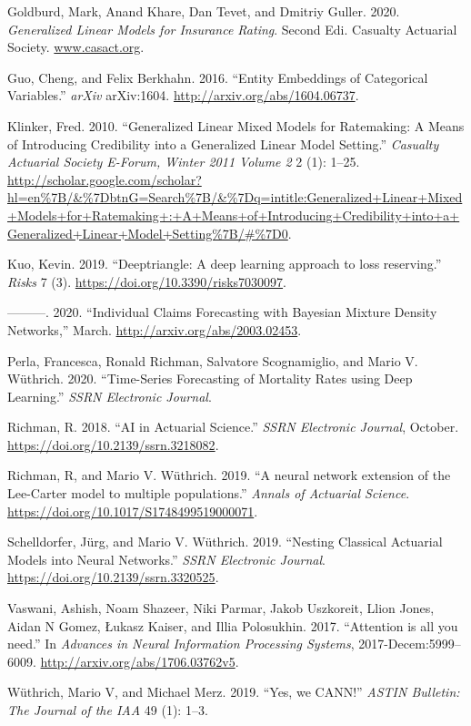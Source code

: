 \documentclass{article}
\newlength{\cslhangindent}
\newenvironment{cslreferences}%
  {\setlength{\parindent}{0pt}%
  \everypar{\setlength{\hangindent}{\cslhangindent}}\ignorespaces}%
  {\par}
\begin{document}
\begin{cslreferences}
\leavevmode\hypertarget{ref-Goldburd}{}%
Goldburd, Mark, Anand Khare, Dan Tevet, and Dmitriy Guller. 2020.
\emph{Generalized Linear Models for Insurance Rating}. Second Edi.
Casualty Actuarial Society. \url{www.casact.org}.

\leavevmode\hypertarget{ref-Guo2016}{}%
Guo, Cheng, and Felix Berkhahn. 2016. ``Entity Embeddings of Categorical
Variables.'' \emph{arXiv} arXiv:1604.
\url{http://arxiv.org/abs/1604.06737}.

\leavevmode\hypertarget{ref-Klinker2010}{}%
Klinker, Fred. 2010. ``Generalized Linear Mixed Models for Ratemaking: A
Means of Introducing Credibility into a Generalized Linear Model
Setting.'' \emph{Casualty Actuarial Society E-Forum, Winter 2011 Volume
2} 2 (1): 1--25.
\url{http://scholar.google.com/scholar?hl=en\%7B/\&\%7DbtnG=Search\%7B/\&\%7Dq=intitle:Generalized+Linear+Mixed+Models+for+Ratemaking+:+A+Means+of+Introducing+Credibility+into+a+Generalized+Linear+Model+Setting\%7B/\#\%7D0}.

\leavevmode\hypertarget{ref-Kuo2019}{}%
Kuo, Kevin. 2019. ``Deeptriangle: A deep learning approach to loss
reserving.'' \emph{Risks} 7 (3).
\url{https://doi.org/10.3390/risks7030097}.

\leavevmode\hypertarget{ref-Kuo2020}{}%
---------. 2020. ``Individual Claims Forecasting with Bayesian Mixture
Density Networks,'' March. \url{http://arxiv.org/abs/2003.02453}.

\leavevmode\hypertarget{ref-Richman2020}{}%
Perla, Francesca, Ronald Richman, Salvatore Scognamiglio, and Mario V.
Wüthrich. 2020. ``Time-Series Forecasting of Mortality Rates using Deep
Learning.'' \emph{SSRN Electronic Journal}.

\leavevmode\hypertarget{ref-Richman2018}{}%
Richman, R. 2018. ``AI in Actuarial Science.'' \emph{SSRN Electronic
Journal}, October. \url{https://doi.org/10.2139/ssrn.3218082}.

\leavevmode\hypertarget{ref-Richman2019d}{}%
Richman, R, and Mario V. Wüthrich. 2019. ``A neural network extension of
the Lee-Carter model to multiple populations.'' \emph{Annals of
Actuarial Science}. \url{https://doi.org/10.1017/S1748499519000071}.

\leavevmode\hypertarget{ref-schelldorfer2019nesting}{}%
Schelldorfer, Jürg, and Mario V. Wüthrich. 2019. ``Nesting Classical
Actuarial Models into Neural Networks.'' \emph{SSRN Electronic Journal}.
\url{https://doi.org/10.2139/ssrn.3320525}.

\leavevmode\hypertarget{ref-Vaswani2017}{}%
Vaswani, Ashish, Noam Shazeer, Niki Parmar, Jakob Uszkoreit, Llion
Jones, Aidan N Gomez, Łukasz Kaiser, and Illia Polosukhin. 2017.
``Attention is all you need.'' In \emph{Advances in Neural Information
Processing Systems}, 2017-Decem:5999--6009.
\url{http://arxiv.org/abs/1706.03762v5}.

\leavevmode\hypertarget{ref-wuthrich2019yes}{}%
Wüthrich, Mario V, and Michael Merz. 2019. ``Yes, we CANN!'' \emph{ASTIN
Bulletin: The Journal of the IAA} 49 (1): 1--3.
\end{cslreferences}



\end{document}
